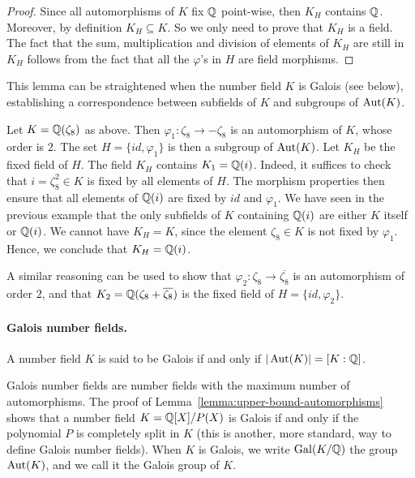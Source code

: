 \begin{proof}
Since all automorphisms of $K$ fix $\mathbb{Q}$ point-wise, then $K_H$ contains $\mathbb{Q}$. Moreover, by definition $K_H \subseteq K$. So we only need to prove that $K_H$ is a field. The fact that the sum, multiplication and division of elements of $K_H$ are still in $K_H$ follows from the fact that all the $\varphi$'s in $H$ are field morphisms.
\end{proof}

This lemma can be straightened when the number field $K$ is Galois (see below), establishing a correspondence between subfields of $K$ and subgroups of $\operatorname{Aut}(K)$.

\begin{example}
Let $K = \mathbb{Q}(\zeta_8)$ as above. Then $\varphi_1: \zeta_8 \rightarrow -\zeta_8$ is an automorphism of $K$, whose order is $2$. The set $H = \{id, \varphi_1\}$ is then a subgroup of $\operatorname{Aut}(K)$. Let $K_H$ be the fixed field of $H$. The field $K_H$ contains $K_1 = \mathbb{Q}(i)$. Indeed, it suffices to check that $i = \zeta_8^2 \in K$ is fixed by all elements of $H$. The morphism properties then ensure that all elements of $\mathbb{Q}(i)$ are fixed by $id$ and $\varphi_1$. We have seen in the previous example that the only subfields of $K$ containing $\mathbb{Q}(i)$ are either $K$ itself or $\mathbb{Q}(i)$. We cannot have $K_H = K$, since the element $\zeta_8 \in K$ is not fixed by $\varphi_1$. Hence, we conclude that $K_H = \mathbb{Q}(i)$.

A similar reasoning can be used to show that $\varphi_2: \zeta_8 \rightarrow \overline{\zeta_8}$ is an automorphism of order $2$, and that $K_2 = \mathbb{Q}(\zeta_8 + \overline{\zeta_8})$ is the fixed field of $H = \{id, \varphi_2\}$.
\end{example}


\paragraph{Galois number fields.} 

\begin{definition}
A number field $K$ is said to be Galois if and only if $|\operatorname{Aut}(K)| = [K:\mathbb{Q}]$.
\end{definition}
Galois number fields are number fields with the maximum number of automorphisms. The proof of Lemma~\ref{lemma:upper-bound-automorphisms} shows that a number field $K = \mathbb{Q}[X]/P(X)$ is Galois if and only if the polynomial $P$ is completely split in $K$ (this is another, more standard, way to define Galois number fields). When $K$ is Galois, we write $\operatorname{Gal}(K/\mathbb{Q})$ the group $\operatorname{Aut}(K)$, and we call it the Galois group of $K$.

